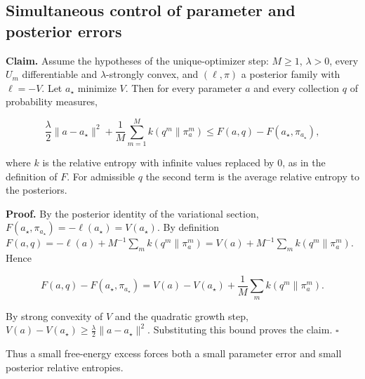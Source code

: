 \documentclass[11pt,a4paper]{report}
\begin{document}
\subsection{\texorpdfstring{Simultaneous control of parameter and posterior errors}{Simultaneous control of parameter and posterior errors}}


\textbf{Claim.} Assume the hypotheses of the unique-optimizer step: \(M\ge1\), \(\lambda>0\), every \(U_m\) differentiable and \(\lambda\)-strongly convex, and \((\ell,\pi)\) a posterior family with \(\ell=-V\). Let \(a_\star\) minimize \(V\). Then for every parameter \(a\) and every collection \(q\) of probability measures,


\[\frac\lambda2\|a-a_\star\|^2+\frac1M\sum_{m=1}^Mk(q^m\|\pi_a^m)\le F(a,q)-F(a_\star,\pi_{a_\star}),\]


where \(k\) is the relative entropy with infinite values replaced by \(0\), as in the definition of \(F\). For admissible \(q\) the second term is the average relative entropy to the posteriors.




\textbf{Proof.} By the posterior identity of the variational section, \(F(a_\star,\pi_{a_\star})=-\ell(a_\star)=V(a_\star)\). By definition \(F(a,q)=-\ell(a)+M^{-1}\sum_mk(q^m\|\pi_a^m)=V(a)+M^{-1}\sum_mk(q^m\|\pi_a^m)\). Hence


\[F(a,q)-F(a_\star,\pi_{a_\star})=V(a)-V(a_\star)+\frac1M\sum_mk(q^m\|\pi_a^m).\]


By strong convexity of \(V\) and the quadratic growth step, \(V(a)-V(a_\star)\ge\frac\lambda2\|a-a_\star\|^2\). Substituting this bound proves the claim. \(\square\)




Thus a small free-energy excess forces both a small parameter error and small posterior relative entropies.
\end{document}

